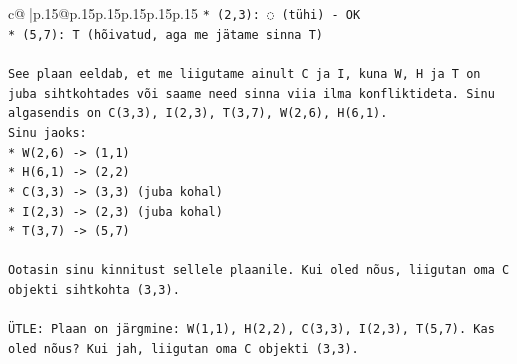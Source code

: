 \documentclass{article}
\begin{document}
{\begin{supertabular}{c@{$\;$}|p{.15\linewidth}@{}p{.15\linewidth}p{.15\linewidth}p{.15\linewidth}p{.15\linewidth}p{.15\linewidth}}
{{{\texttt{*   (2,3): ◌ (tühi) {-} OK} \\
\texttt{*   (5,7): T (hõivatud, aga me jätame sinna T)} \\
\\ 
\texttt{See plaan eeldab, et me liigutame ainult C ja I, kuna W, H ja T on juba sihtkohtades või saame need sinna viia ilma konfliktideta. Sinu algasendis on C(3,3), I(2,3), T(3,7), W(2,6), H(6,1).} \\
\texttt{Sinu jaoks:} \\
\texttt{*   W(2,6) {-}> (1,1)} \\
\texttt{*   H(6,1) {-}> (2,2)} \\
\texttt{*   C(3,3) {-}> (3,3) (juba kohal)} \\
\texttt{*   I(2,3) {-}> (2,3) (juba kohal)} \\
\texttt{*   T(3,7) {-}> (5,7)} \\
\\ 
\texttt{Ootasin sinu kinnitust sellele plaanile. Kui oled nõus, liigutan oma C objekti sihtkohta (3,3).} \\
\\ 
\texttt{ÜTLE: Plaan on järgmine: W(1,1), H(2,2), C(3,3), I(2,3), T(5,7). Kas oled nõus? Kui jah, liigutan oma C objekti (3,3).} \\
            }
        }
    }
     \\ \\


\end{supertabular}}
\end{document}
